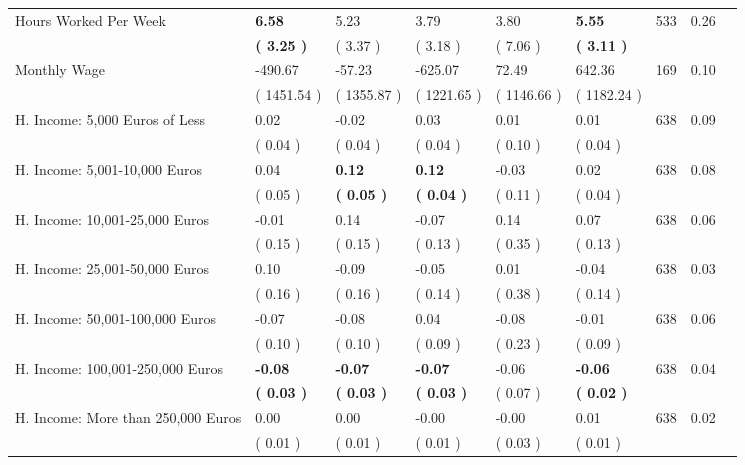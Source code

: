 \begin{tabular}{L{6.2cm} C{1.8cm} C{1.8cm} C{1.8cm} C{1.8cm} C{1.8cm} C{1.8cm} C{0.3cm} C{0.3cm}}
Hours Worked Per Week & \textbf{     6.58} &      5.23 &      3.79 &      3.80 & \textbf{     5.55}  & 533 &       0.26 \\ 
 & \textbf{(     3.25 )} & (     3.37 ) & (     3.18 ) & (     7.06 ) & \textbf{(     3.11 )}  & \\
Monthly Wage &   -490.67 &    -57.23 &   -625.07 &     72.49 &    642.36  & 169 &       0.10 \\ 
 & (  1451.54 ) & (  1355.87 ) & (  1221.65 ) & (  1146.66 ) & (  1182.24 )  & \\
H. Income: 5,000 Euros of Less &      0.02 &     -0.02 &      0.03 &      0.01 &      0.01  & 638 &       0.09 \\ 
 & (     0.04 ) & (     0.04 ) & (     0.04 ) & (     0.10 ) & (     0.04 )  & \\
H. Income: 5,001-10,000 Euros &      0.04 & \textbf{     0.12} & \textbf{     0.12} &     -0.03 &      0.02  & 638 &       0.08 \\ 
 & (     0.05 ) & \textbf{(     0.05 )} & \textbf{(     0.04 )} & (     0.11 ) & (     0.04 )  & \\
H. Income: 10,001-25,000 Euros &     -0.01 &      0.14 &     -0.07 &      0.14 &      0.07  & 638 &       0.06 \\ 
 & (     0.15 ) & (     0.15 ) & (     0.13 ) & (     0.35 ) & (     0.13 )  & \\
H. Income: 25,001-50,000 Euros &      0.10 &     -0.09 &     -0.05 &      0.01 &     -0.04  & 638 &       0.03 \\ 
 & (     0.16 ) & (     0.16 ) & (     0.14 ) & (     0.38 ) & (     0.14 )  & \\
H. Income: 50,001-100,000 Euros &     -0.07 &     -0.08 &      0.04 &     -0.08 &     -0.01  & 638 &       0.06 \\ 
 & (     0.10 ) & (     0.10 ) & (     0.09 ) & (     0.23 ) & (     0.09 )  & \\
H. Income: 100,001-250,000 Euros & \textbf{    -0.08} & \textbf{    -0.07} & \textbf{    -0.07} &     -0.06 & \textbf{    -0.06}  & 638 &       0.04 \\ 
 & \textbf{(     0.03 )} & \textbf{(     0.03 )} & \textbf{(     0.03 )} & (     0.07 ) & \textbf{(     0.02 )}  & \\
H. Income: More than 250,000 Euros &      0.00 &      0.00 &     -0.00 &     -0.00 &      0.01  & 638 &       0.02 \\ 
 & (     0.01 ) & (     0.01 ) & (     0.01 ) & (     0.03 ) & (     0.01 )  & \\
\bottomrule
\end{tabular}
